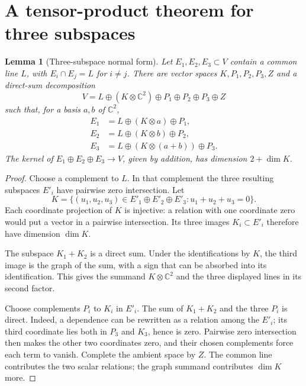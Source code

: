 \documentclass[11pt]{article}
\newtheorem{lemma}[theorem]{Lemma}
\theoremstyle{remark}\newtheorem{remark}[theorem]{Remark}
\newcommand{\C}{\mathbb C}
\begin{document}
\section{A tensor-product theorem for three subspaces}\label{sec:product}
\begin{lemma}[Three-subspace normal form]\label{lem:three}
Let $E_1,E_2,E_3\subset V$ contain a common line $L$, with $E_i\cap E_j=L$ for $i\ne j$. There are vector spaces $K,P_1,P_2,P_3,Z$ and a direct-sum decomposition
\[
 V=L\oplus(K\otimes\C^2)\oplus P_1\oplus P_2\oplus P_3\oplus Z
\]
such that, for a basis $a,b$ of $\C^2$,
\begin{align*}
 E_1&=L\oplus(K\otimes a)\oplus P_1,\\
 E_2&=L\oplus(K\otimes b)\oplus P_2,\\
 E_3&=L\oplus(K\otimes(a+b))\oplus P_3.
\end{align*}
The kernel of $E_1\oplus E_2\oplus E_3\to V$, given by addition, has dimension $2+\dim K$.
\end{lemma}
\begin{proof}
Choose a complement to $L$. In that complement the three resulting subspaces $E'_i$ have pairwise zero intersection. Let
\[
 K=\{(u_1,u_2,u_3)\in E'_1\oplus E'_2\oplus E'_3:u_1+u_2+u_3=0\}.
\]
Each coordinate projection of $K$ is injective: a relation with one coordinate zero would put a vector in a pairwise intersection. Its three images $K_i\subset E'_i$ therefore have dimension $\dim K$.

The subspace $K_1+K_2$ is a direct sum. Under the identifications by $K$, the third image is the graph of the sum, with a sign that can be absorbed into its identification. This gives the summand $K\otimes\C^2$ and the three displayed lines in its second factor.

Choose complements $P_i$ to $K_i$ in $E'_i$. The sum of $K_1+K_2$ and the three $P_i$ is direct. Indeed, a dependence can be rewritten as a relation among the $E'_i$; its third coordinate lies both in $P_3$ and $K_3$, hence is zero. Pairwise zero intersection then makes the other two coordinates zero, and their chosen complements force each term to vanish. Complete the ambient space by $Z$. The common line contributes the two scalar relations; the graph summand contributes $\dim K$ more.
\end{proof}
\end{document}
